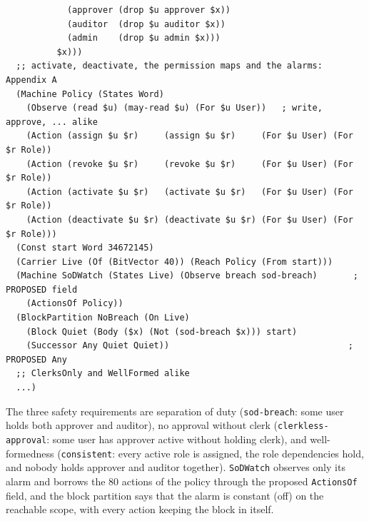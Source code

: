 \documentclass[11pt]{article}
\newcommand{\code}[1]{\texttt{#1}}
\theoremstyle{definition}
\theoremstyle{plain}
\begin{document}
\begin{lstlisting}
            (approver (drop $u approver $x))
            (auditor  (drop $u auditor $x))
            (admin    (drop $u admin $x)))
          $x)))
  ;; activate, deactivate, the permission maps and the alarms: Appendix A
  (Machine Policy (States Word)
    (Observe (read $u) (may-read $u) (For $u User))   ; write, approve, ... alike
    (Action (assign $u $r)     (assign $u $r)     (For $u User) (For $r Role))
    (Action (revoke $u $r)     (revoke $u $r)     (For $u User) (For $r Role))
    (Action (activate $u $r)   (activate $u $r)   (For $u User) (For $r Role))
    (Action (deactivate $u $r) (deactivate $u $r) (For $u User) (For $r Role)))
  (Const start Word 34672145)
  (Carrier Live (Of (BitVector 40)) (Reach Policy (From start)))
  (Machine SoDWatch (States Live) (Observe breach sod-breach)       ; PROPOSED field
    (ActionsOf Policy))
  (BlockPartition NoBreach (On Live)
    (Block Quiet (Body ($x) (Not (sod-breach $x))) start)
    (Successor Any Quiet Quiet))                                   ; PROPOSED Any
  ;; ClerksOnly and WellFormed alike
  ...)
\end{lstlisting}
The three safety requirements are separation of duty (\code{sod-breach}: some user holds both
approver and auditor), no approval without clerk (\code{clerkless-approval}: some user has approver
active without holding clerk), and well-formedness (\code{consistent}: every active role is
assigned, the role dependencies hold, and nobody holds approver and auditor together).
\code{SoDWatch} observes only its alarm and borrows the $80$ actions of the policy through the
proposed \code{ActionsOf} field, and the block partition says that the alarm is constant (off) on
the reachable scope, with every action keeping the block in itself.
\end{document}
